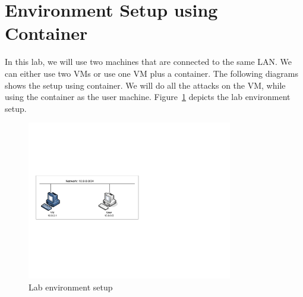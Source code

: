 \section{Environment Setup using Container} 

In this lab, we will use two machines that are connected
to the same LAN. We can either use
two VMs or use one VM plus a container. 
The following diagrams shows the setup using container. 
We will do all the attacks on the VM, while using
the container as the user machine. Figure~\ref{fig:labsetup}
depicts the lab environment setup.


\begin{figure}[htb]
\begin{center}
\includegraphics[width=0.8\textwidth]{Figs/OneLan_onehost.pdf}
\end{center}
\caption{Lab environment setup}
\label{fig:labsetup}
\end{figure}
 

%
 






